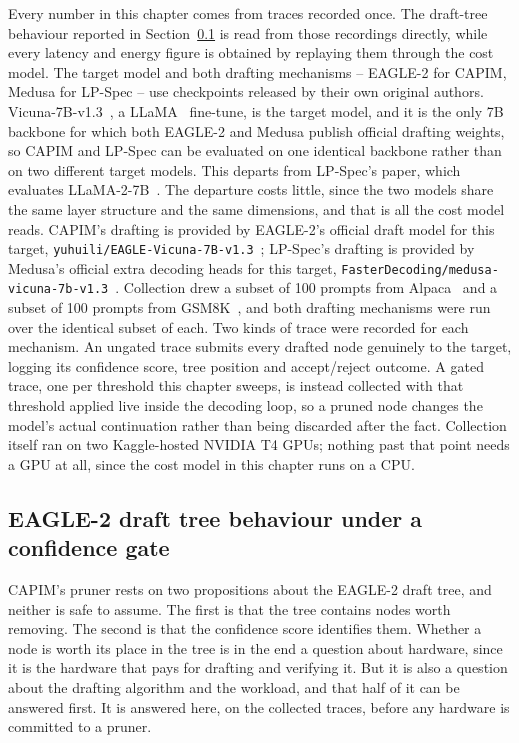 \documentclass[11pt]{article}
\begin{document}
Every number in this chapter comes from traces recorded once. The draft-tree behaviour reported in Section~\ref{sec:pruning} is read from those recordings directly, while every latency and energy figure is obtained by replaying them through the cost model. The target model and both drafting mechanisms -- EAGLE-2 for CAPIM, Medusa for LP-Spec -- use checkpoints released by their own original authors. Vicuna-7B-v1.3~\cite{hfvicuna}, a LLaMA~\cite{touvron2023llama} fine-tune, is the target model, and it is the only 7B backbone for which both EAGLE-2 and Medusa publish official drafting weights, so CAPIM and LP-Spec can be evaluated on one identical backbone rather than on two different target models. This departs from LP-Spec's paper, which evaluates LLaMA-2-7B~\cite{touvron2023llama2}. The departure costs little, since the two models share the same layer structure and the same dimensions, and that is all the cost model reads. CAPIM's drafting is provided by EAGLE-2's official draft model for this target, \nolinkurl{yuhuili/EAGLE-Vicuna-7B-v1.3}~\cite{li2024eagle,li2024eagle2,hfeaglevicuna}; LP-Spec's drafting is provided by Medusa's official extra decoding heads for this target, \nolinkurl{FasterDecoding/medusa-vicuna-7b-v1.3}~\cite{cai2024medusa,hfmedusavicuna}. Collection drew a subset of 100 prompts from Alpaca~\cite{taori2023alpaca} and a subset of 100 prompts from GSM8K~\cite{cobbe2021gsm8k}, and both drafting mechanisms were run over the identical subset of each. Two kinds of trace were recorded for each mechanism. An ungated trace submits every drafted node genuinely to the target, logging its confidence score, tree position and accept/reject outcome. A gated trace, one per threshold this chapter sweeps, is instead collected with that threshold applied live inside the decoding loop, so a pruned node changes the model's actual continuation rather than being discarded after the fact. Collection itself ran on two Kaggle-hosted NVIDIA T4 GPUs; nothing past that point needs a GPU at all, since the cost model in this chapter runs on a CPU.

\subsection{EAGLE-2 draft tree behaviour under a confidence gate}
\label{sec:pruning}

CAPIM's pruner rests on two propositions about the EAGLE-2 draft tree, and neither is safe to assume. The first is that the tree contains nodes worth removing. The second is that the confidence score identifies them. Whether a node is worth its place in the tree is in the end a question about hardware, since it is the hardware that pays for drafting and verifying it. But it is also a question about the drafting algorithm and the workload, and that half of it can be answered first. It is answered here, on the collected traces, before any hardware is committed to a pruner.
\end{document}
